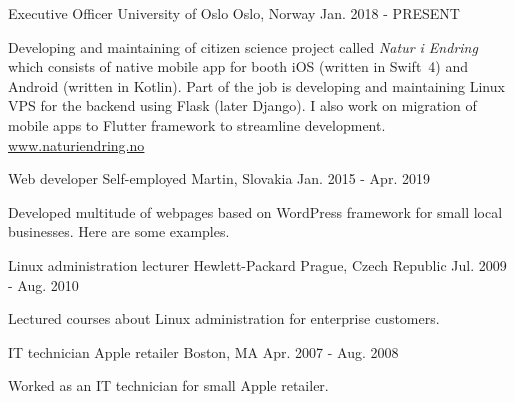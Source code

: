 
\begin{cventries}
  \cventry
    {Executive Officer} %
    {University of Oslo} %
    {Oslo, Norway} %
    {Jan. 2018 - PRESENT} %
    {
      \begin{cvitems} %
        \item {Developing and maintaining of citizen science project called \textit{Natur i Endring} which consists of native mobile app for booth iOS (written in \mbox{Swift 4}) and Android (written in Kotlin). Part of the job is developing and maintaining Linux VPS for the backend using Flask (later Django). I also work on migration of mobile apps to Flutter framework to streamline development. \underline{\href{https://naturiendring.no}{www.naturiendring.no}}}
      \end{cvitems}
    }
    
    \cventry
    {Web developer} %
    {Self-employed} %
    {Martin, Slovakia} %
    {Jan. 2015 - Apr. 2019} %
    {
      \begin{cvitems} %
        \item {Developed multitude of webpages based on WordPress framework for small local businesses. Here are some examples.}
      \end{cvitems}
    }

  \cventry
    {Linux administration lecturer} %
    {Hewlett-Packard} %
    {Prague, Czech Republic} %
    {Jul. 2009 - Aug. 2010} %
    {
      \begin{cvitems} %
        \item {Lectured courses about Linux administration for enterprise customers.}
      \end{cvitems}
    }

  \cventry
    {IT technician} %
    {Apple retailer} %
    {Boston, MA} %
    {Apr. 2007 - Aug. 2008} %
    {
      \begin{cvitems} %
        \item {Worked as an IT technician for small Apple retailer.}
      \end{cvitems}
    }

  
\end{cventries}
